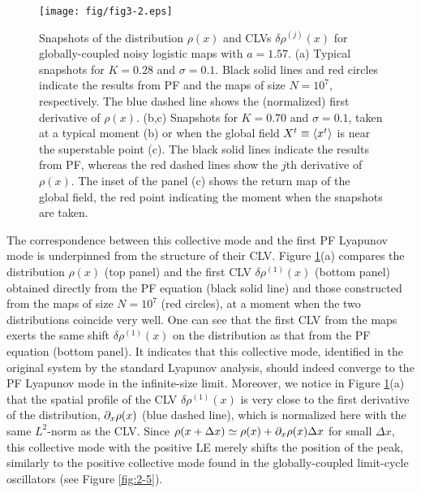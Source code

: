 \documentclass[12pt]{iopart}
\begin{document}
\begin{figure}[t]
 \begin{center}
  \texttt{[image: fig/fig3-2.eps]}
  \caption{Snapshots of the distribution $\rho(x)$ and CLVs $\delta\rho^{(j)}(x)$ for globally-coupled noisy logistic maps  with $a=1.57$. (a) Typical snapshots for $K=0.28$ and $\sigma = 0.1$. Black solid lines and red circles indicate the results from PF and the maps of size $N=10^7$, respectively. The blue dashed line shows the (normalized) first derivative of $\rho(x)$. (b,c) Snapshots for $K=0.70$ and $\sigma = 0.1$, taken at a typical moment (b) or when the global field $X^t \equiv \langle x^t \rangle$ is near the superstable point (c). The black solid lines indicate the results from PF, whereas the red dashed lines show the $j$th derivative of $\rho(x)$. The inset of the panel (c) shows the return map of the global field, the red point indicating the moment when the snapshots are taken.}
  \label{fig:3-2}
 \end{center}
\end{figure}%

The correspondence between this collective mode
 and the first PF Lyapunov mode is underpinned
 from the structure of their CLV.
Figure \ref{fig:3-2}(a) compares the distribution $\rho(x)$ (top panel)
 and the first CLV $\delta\rho^{(1)}(x)$ (bottom panel)
 obtained directly from the PF equation (black solid line)
 and those constructed from the maps of size $N=10^7$ (red circles),
 at a moment when the two distributions coincide very well.
One can see that the first CLV from the maps exerts the same shift
 $\delta\rho^{(1)}(x)$ on the distribution as that from the PF equation
 (bottom panel).
It indicates that this collective mode,
 identified in the original system by the standard Lyapunov analysis,
 should indeed converge to the PF Lyapunov mode in the infinite-size limit.
Moreover, we notice in Figure \ref{fig:3-2}(a)
 that the spatial profile of the CLV $\delta\rho^{(1)}(x)$ is very close
 to the first derivative of the distribution, $\partial_x\rho(x)$
 (blue dashed line), which is normalized here
 with the same $L^2$-norm as the CLV.
Since $\rho(x+\Delta x) \simeq \rho(x) + \partial_x\rho(x)\Delta x$
 for small $\Delta x$, this collective mode with the positive LE
 merely shifts the position of the peak,
 similarly to the positive collective mode
 found in the globally-coupled limit-cycle oscillators
 (see Figure \ref{fig:2-5}).
\end{document}
